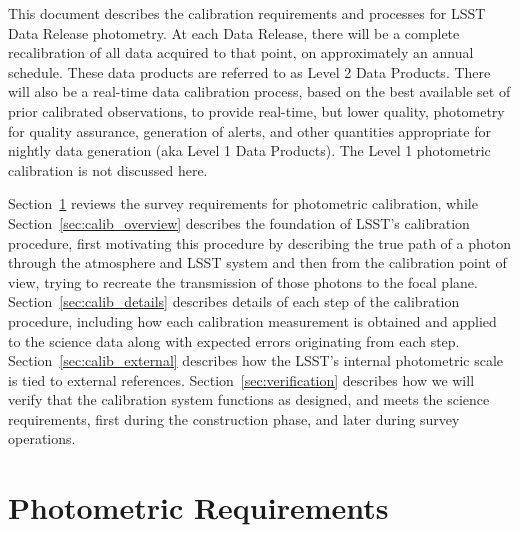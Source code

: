 \documentclass[12pt,preprint]{aastex}
\begin{document}
This document describes the calibration requirements and processes for
LSST Data Release photometry. At each Data Release, there will be a
complete recalibration of all data acquired to that point, on
approximately an annual schedule.  These data products are referred to
as Level 2 Data Products.  There will
also be a real-time data calibration process, based on the best
available set of prior calibrated observations, to provide real-time, but lower quality,
                                                                                                 photometry for quality assurance,
generation of alerts, and other quantities appropriate for nightly
data generation (aka Level 1 Data Products).  The Level 1 photometric
calibration is not discussed here.

Section~\ref{sec:photoreq} reviews the survey requirements for
photometric calibration, while Section~\ref{sec:calib_overview}
describes the foundation of LSST's calibration procedure, first
motivating this procedure by describing the true path of a photon
through the atmosphere and LSST system and then from the calibration
point of view, trying to recreate the transmission of those photons to
the focal plane.  Section~\ref{sec:calib_details} describes details of
each step of the calibration procedure, including how each calibration
measurement is obtained and applied to the science data along with
expected errors originating from each step.
Section~\ref{sec:calib_external} describes how the LSST's internal
photometric scale is tied to external references.
Section~\ref{sec:verification} describes how we will verify that the
calibration system functions as designed, and meets the science
requirements, first during the construction phase, and later during
survey operations.


\section{Photometric Requirements}
\label{sec:photoreq}
\end{document}
